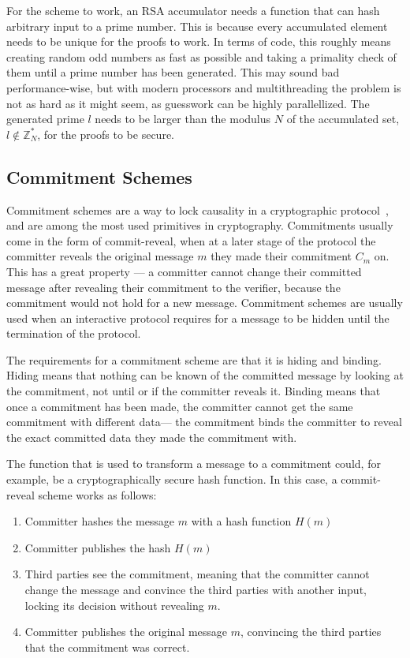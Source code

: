 For the scheme to work, an RSA accumulator needs a function that can hash arbitrary input to a prime number. This is because every accumulated element needs to be unique for the proofs to work. In terms of code, this roughly means creating random odd numbers as fast as possible and taking a primality check of them until a prime number has been generated. This may sound bad performance-wise, but with modern processors and multithreading the problem is not as hard as it might seem, as guesswork can be highly parallellized. The generated prime \(l\) needs to be larger than the modulus \(N\) of the accumulated set, \(l \notin \mathbb{Z}^*_N\), for the proofs to be secure.

\subsection{Commitment Schemes}
Commitment schemes are a way to lock causality in a cryptographic protocol~\cite{Damgard1998-vs}, and are among the most used primitives in cryptography. Commitments usually come in the form of commit-reveal, when at a later stage of the protocol the committer reveals the original message \(m\) they made their commitment \(C_m\) on. This has a great property --- a committer cannot change their committed message after revealing their commitment to the verifier, because the commitment would not hold for a new message. Commitment schemes are usually used when an interactive protocol requires for a message to be hidden until the termination of the protocol.

The requirements for a commitment scheme are that it is hiding and binding. Hiding means that nothing can be known of the committed message by looking at the commitment, not until or if the committer reveals it. Binding means that once a commitment has been made, the committer cannot get the same commitment with different data--- the commitment binds the committer to reveal the exact committed data they made the commitment with.

The function that is used to transform a message to a commitment could, for example, be a cryptographically secure hash function. In this case, a commit-reveal scheme works as follows:

\begin{enumerate}
  \item Committer hashes the message \(m\) with a hash function \(H(m)\)
  \item Committer publishes the hash \(H(m)\)
  \item Third parties see the commitment, meaning that the committer cannot change the message and convince the third parties with another input, locking its decision without revealing \(m\).
  \item Committer publishes the original message \(m\), convincing the third parties that the commitment was correct.
\end{enumerate}

